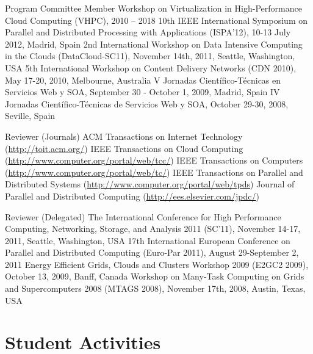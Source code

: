 \documentclass{resume}
\begin{document}
\vspace{1em}

\begin{category}{Program Committee Member}
\citembullet Workshop on Virtualization in High-Performance Cloud Computing (VHPC), 2010 -- 2018
\citembullet 10th IEEE International Symposium on Parallel and Distributed Processing with Applications (ISPA'12), 10-13 July 2012, Madrid, Spain 
\citembullet 2nd International Workshop on Data Intensive Computing in the Clouds (DataCloud-SC11), November 14th, 2011, Seattle, Washington, USA
\citembullet 5th International Workshop on Content Delivery Networks (CDN 2010), May 17-20, 2010, Melbourne, Australia
\citembullet V Jornadas Científico-Técnicas en Servicios Web y SOA, September 30 - October 1, 2009, Madrid, Spain
\citembullet IV Jornadas Científico-Técnicas de Servicios Web y SOA, October 29-30, 2008, Seville, Spain
\end{category}

\begin{category}{Reviewer (Journals)}
\citembullet ACM Transactions on Internet Technology (\url{http://toit.acm.org/})
\citembullet IEEE Transactions on Cloud Computing (\url{http://www.computer.org/portal/web/tcc/})
\citembullet IEEE Transactions on Computers (\url{http://www.computer.org/portal/web/tc/})
\citembullet IEEE Transactions on Parallel and Distributed Systems (\url{http://www.computer.org/portal/web/tpds})
\citembullet Journal of Parallel and Distributed Computing (\url{http://ees.elsevier.com/jpdc/})
\end{category}

\begin{category}{Reviewer (Delegated)}
\citembullet The International Conference for High Performance Computing, Networking, Storage, and Analysis 2011 (SC'11), November 14-17, 2011, Seattle, Washington, USA
\citembullet 17th International European Conference on Parallel and Distributed Computing (Euro-Par 2011), August 29-September 2, 2011 
\citembullet Energy Efficient Grids, Clouds and Clusters Workshop 2009 (E2GC2 2009), October 13, 2009, Banff, Canada 
\citembullet Workshop on Many-Task Computing on Grids and Supercomputers 2008 (MTAGS 2008), November 17th, 2008, Austin, Texas, USA
\end{category}

\section*{\hspace{-1cm}Student Activities}
\end{document}
